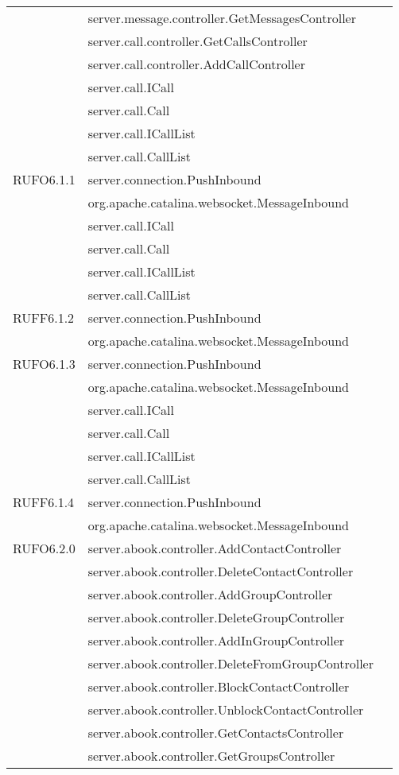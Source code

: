 \begin{center}
\begin{longtable}{lp{}l}
& server.message.controller.GetMessagesController\\
& server.call.controller.GetCallsController\\
& server.call.controller.AddCallController\\
 & server.call.ICall\\
& server.call.Call\\
 & server.call.ICallList\\
& server.call.CallList\\
RUFO6.1.1 & server.connection.PushInbound\\
& org.apache.catalina.websocket.MessageInbound\\
& server.call.ICall\\
& server.call.Call\\
& server.call.ICallList\\
& server.call.CallList\\
RUFF6.1.2 & server.connection.PushInbound\\
& org.apache.catalina.websocket.MessageInbound\\
RUFO6.1.3 & server.connection.PushInbound\\
& org.apache.catalina.websocket.MessageInbound\\
& server.call.ICall\\
& server.call.Call\\
& server.call.ICallList\\
& server.call.CallList\\
RUFF6.1.4 & server.connection.PushInbound\\
& org.apache.catalina.websocket.MessageInbound\\
RUFO6.2.0 & server.abook.controller.AddContactController\\
& server.abook.controller.DeleteContactController\\
& server.abook.controller.AddGroupController\\
& server.abook.controller.DeleteGroupController\\
& server.abook.controller.AddInGroupController\\
& server.abook.controller.DeleteFromGroupController\\
& server.abook.controller.BlockContactController\\
& server.abook.controller.UnblockContactController\\
& server.abook.controller.GetContactsController\\
& server.abook.controller.GetGroupsController\\

\end{longtable}
\end{center}
